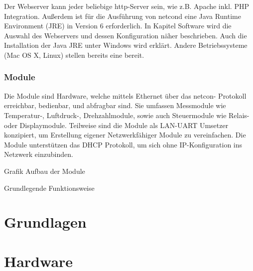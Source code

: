 \documentclass[a4paper,14pt,headsepline]{scrartcl}
\begin{document}
Der Webserver kann jeder beliebige http-Server sein, wie z.B. Apache inkl. PHP Integration. Außerdem ist für die Ausführung von netcond eine Java Runtime Environment (JRE) in Version 6 erforderlich. In Kapitel Software wird die Auswahl des Webservers und dessen Konfiguration näher beschrieben. Auch die Installation der Java JRE unter Windows wird erklärt. Andere Betriebssysteme (Mac OS X, Linux) stellen bereits eine bereit.

\newpage

\subsubsection{Module}

Die Module sind Hardware, welche mittels Ethernet über das netcon- Protokoll erreichbar, bedienbar, und abfragbar sind. Sie umfassen Messmodule wie Temperatur-, Luftdruck-, Drehzahlmodule, sowie auch Steuermodule wie Relais- oder Displaymodule. Teilweise sind die Module als LAN-UART Umsetzer konzipiert, um Erstellung eigener Netzwerkfähiger Module zu vereinfachen. Die Module unterstützen das DHCP Protokoll, um sich ohne IP-Konfiguration ins Netzwerk einzubinden.

Grafik Aufbau der Module 

Grundlegende Funktionsweise


\newpage

\section{Grundlagen}

\section{Hardware}
\end{document}
